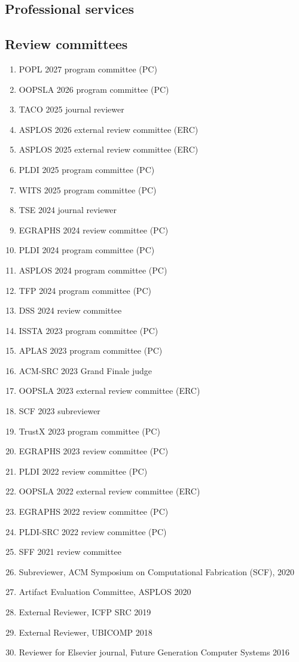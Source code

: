 \documentclass[margin, 10pt]{res} %
\begin{document}
\begin{resume}
\section{Professional services}


\subsection{Review committees}

\begin{enumerate}[itemsep=-2pt]
\item POPL 2027 program committee (PC)
\item OOPSLA 2026 program committee (PC)
\item TACO 2025 journal reviewer
\item ASPLOS 2026 external review committee (ERC)
\item ASPLOS 2025 external review committee (ERC)
\item PLDI 2025 program committee (PC)
\item WITS 2025 program committee (PC)
\item TSE 2024 journal reviewer
\item EGRAPHS 2024 review committee (PC)
\item PLDI 2024 program committee (PC)
\item ASPLOS 2024 program committee (PC)
\item TFP 2024 program committee (PC)
\item DSS 2024 review committee
\item ISSTA 2023 program committee (PC)
\item APLAS 2023 program committee (PC)
\item ACM-SRC 2023 Grand Finale judge
\item OOPSLA 2023 external review committee (ERC)
\item SCF 2023 subreviewer
\item TrustX 2023 program committee (PC)
\item EGRAPHS 2023 review committee (PC)
\item PLDI 2022 review committee (PC)
\item OOPSLA 2022 external review committee (ERC)
\item EGRAPHS 2022 review committee (PC)
\item PLDI-SRC 2022 review committee (PC)
\item SFF 2021 review committee
\item Subreviewer, ACM Symposium on Computational Fabrication (SCF), 2020
\item Artifact Evaluation Committee, ASPLOS 2020
\item External Reviewer, ICFP SRC 2019
\item External Reviewer, UBICOMP 2018
\item Reviewer for Elsevier journal, Future Generation Computer Systems 2016
\end{enumerate}


\end{resume}
\end{document}
